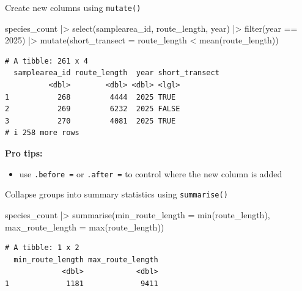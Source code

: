 \documentclass[
  ignorenonframetext,
  aspectratio=169,
]{beamer}
\newenvironment{Shaded}{\begin{snugshade}}{\end{snugshade}}
\newcommand{\AttributeTok}[1]{\textcolor[rgb]{0.40,0.45,0.13}{#1}}
\newcommand{\DecValTok}[1]{\textcolor[rgb]{0.68,0.00,0.00}{#1}}
\newcommand{\FunctionTok}[1]{\textcolor[rgb]{0.28,0.35,0.67}{#1}}
\newcommand{\NormalTok}[1]{\textcolor[rgb]{0.00,0.23,0.31}{#1}}
\newcommand{\SpecialCharTok}[1]{\textcolor[rgb]{0.37,0.37,0.37}{#1}}
\providecommand{\tightlist}{%
  \setlength{\itemsep}{0pt}\setlength{\parskip}{0pt}}
\let\oldtexttt\texttt
\renewcommand{\texttt}[1]{\colorbox{gray!20}{\oldtexttt{#1}}}
\begin{document}
\begin{frame}[fragile]{Create new columns using \texttt{mutate()}}
\protect{}\label{create-new-columns-using-mutate}
\footnotesize

\begin{Shaded}
\begin{Highlighting}[]
\NormalTok{species\_count }\SpecialCharTok{|\textgreater{}} 
    \FunctionTok{select}\NormalTok{(samplearea\_id, route\_length, year) }\SpecialCharTok{|\textgreater{}}
    \FunctionTok{filter}\NormalTok{(year }\SpecialCharTok{==} \DecValTok{2025}\NormalTok{) }\SpecialCharTok{|\textgreater{}} 
    \FunctionTok{mutate}\NormalTok{(}\AttributeTok{short\_transect =}\NormalTok{ route\_length }\SpecialCharTok{\textless{}} \FunctionTok{mean}\NormalTok{(route\_length))}
\end{Highlighting}
\end{Shaded}

\begin{verbatim}
# A tibble: 261 x 4
  samplearea_id route_length  year short_transect
          <dbl>        <dbl> <dbl> <lgl>         
1           268         4444  2025 TRUE          
2           269         6232  2025 FALSE         
3           270         4081  2025 TRUE          
# i 258 more rows
\end{verbatim}

\normalsize

\pause

\textbf{Pro tips:}

\begin{itemize}
\tightlist
\item
  use \texttt{.before\ =} or \texttt{.after\ =} to control where the new
  column is added
\end{itemize}
\end{frame}

\begin{frame}[fragile]{Collapse groups into summary statistics using
\texttt{summarise()}}
\protect{}\label{collapse-groups-into-summary-statistics-using-summarise}
\footnotesize

\begin{Shaded}
\begin{Highlighting}[]
\NormalTok{species\_count }\SpecialCharTok{|\textgreater{}} 
    \FunctionTok{summarise}\NormalTok{(}\AttributeTok{min\_route\_length =} \FunctionTok{min}\NormalTok{(route\_length),}
              \AttributeTok{max\_route\_length =} \FunctionTok{max}\NormalTok{(route\_length))}
\end{Highlighting}
\end{Shaded}

\begin{verbatim}
# A tibble: 1 x 2
  min_route_length max_route_length
             <dbl>            <dbl>
1             1181             9411
\end{verbatim}

\normalsize
\end{frame}
\end{document}
